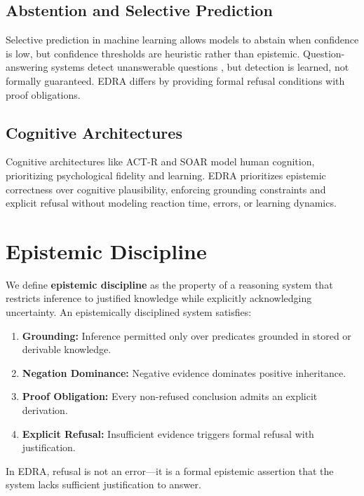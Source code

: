 \documentclass[11pt]{article}
\begin{document}
\subsection{Abstention and Selective Prediction}

Selective prediction in machine learning \cite{geifman2017selective} allows models to abstain when confidence is low, but confidence thresholds are heuristic rather than epistemic. Question-answering systems detect unanswerable questions \cite{rajpurkar2018know}, but detection is learned, not formally guaranteed. EDRA differs by providing formal refusal conditions with proof obligations.

\subsection{Cognitive Architectures}

Cognitive architectures like ACT-R \cite{anderson2004actr} and SOAR \cite{laird2012soar} model human cognition, prioritizing psychological fidelity and learning. EDRA prioritizes epistemic correctness over cognitive plausibility, enforcing grounding constraints and explicit refusal without modeling reaction time, errors, or learning dynamics.

\section{Epistemic Discipline}

We define \textbf{epistemic discipline} as the property of a reasoning system that restricts inference to justified knowledge while explicitly acknowledging uncertainty. An epistemically disciplined system satisfies:

\begin{enumerate}
    \item \textbf{Grounding:} Inference permitted only over predicates grounded in stored or derivable knowledge.
    \item \textbf{Negation Dominance:} Negative evidence dominates positive inheritance.
    \item \textbf{Proof Obligation:} Every non-refused conclusion admits an explicit derivation.
    \item \textbf{Explicit Refusal:} Insufficient evidence triggers formal refusal with justification.
\end{enumerate}

In EDRA, refusal is not an error—it is a formal epistemic assertion that the system lacks sufficient justification to answer.
\end{document}

